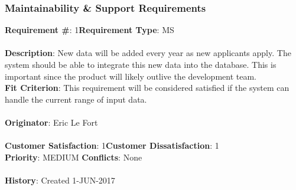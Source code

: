 \documentclass[titlepage]{article}
\begin{document}
\subsubsection{Maintainability \& Support Requirements}
\begin{framed}
	\noindent\textbf{Requirement \#}: 1\hfill \textbf{Requirement Type}: MS\hfill\\\\
	\noindent\textbf{Description}: New data will be added every year as new applicants apply. The system should be able to integrate this new data into the database. This is important since the product will likely outlive the development team.\\
	\textbf{Fit Criterion}: This requirement will be considered satisfied if the system can handle the current range of input data.\\\\
	\textbf{Originator}: Eric Le Fort\\\\
	\noindent\textbf{Customer Satisfaction}: 1\hfill \textbf{Customer Dissatisfaction}: 1\hfill\\
	\textbf{Priority}: MEDIUM \hfill \textbf{Conflicts}: None\hfill\\\\
	\noindent\textbf{History}: Created 1-JUN-2017
\end{framed}
\end{document}
